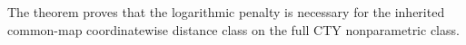 The theorem proves that the logarithmic penalty is necessary for the inherited common-map coordinatewise distance class on the full CTY nonparametric class.